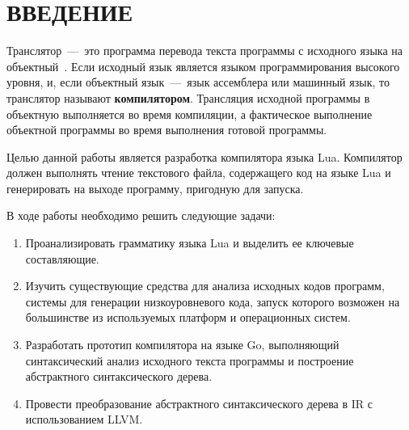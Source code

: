 \chapter*{ВВЕДЕНИЕ}

Транслятор~---~это программа перевода текста программы с исходного языка на объектный~\cite{bib1}. Если исходный язык является языком программирования высокого уровня, и, если объектный язык~---~язык ассемблера или машинный язык, то транслятор называют \textbf{компилятором}. Трансляция исходной программы в объектную выполняется во время компиляции, а фактическое выполнение объектной программы во время выполнения готовой программы.

Целью данной работы является разработка компилятора языка Lua. Компилятор должен выполнять чтение текстового файла, содержащего код на языке Lua и генерировать на выходе программу, пригодную для запуска.


В ходе работы необходимо решить следующие задачи:
\begin{enumerate}
	\item Проанализировать грамматику языка Lua и выделить ее ключевые составляющие.
	\item Изучить существующие средства для анализа исходных кодов программ, системы для генерации низкоуровневого кода, запуск которого возможен на большинстве из используемых платформ и операционных систем.
	\item Разработать прототип компилятора на языке Go, выполняющий синтаксический анализ исходного текста программы и построение абстрактного синтаксического дерева.
	\item Провести преобразование абстрактного синтаксического дерева в IR с использованием LLVM.
\end{enumerate}